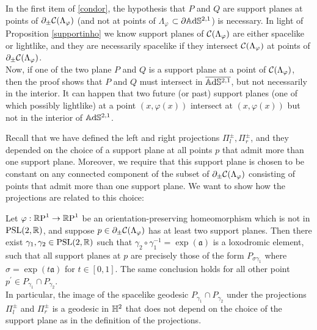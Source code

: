 \begin{observation}
In the first item of \ref{condor}, the hypothesis that $P$ and $Q$ are support planes at points of $\partial_\pm\CF$ (and not at points of $\Lambda_\varphi$ $\subset\partial\A^{2,1}$) is necessary. In light of Proposition \ref{supportinho} we know support planes of $\CF$ are either spacelike or lightlike, and they are necessarily spacelike if they intersect $\CF$ at points of $\partial_\pm\CF$. \\
Now, if one of the two plane $P$ and $Q$ is a support plane at a point of $\CF$, then the proof shows that $P$ and $Q$ must intersect in $\overline{\A^{2,1}}$, but not necessarily in the interior. It can happen that two future (or past) support planes (one of which possibly lightlike) at a point $(x,\varphi(x))$ intersect at $(x,\varphi(x))$ but not in the interior of $\A^{2,1}$.
\end{observation}
 
 Recall that we have defined the left and right projections $\Pi_l^\pm, \Pi_r^\pm$, and they depended on the choice of a support plane at all points $p$ that admit more than one support plane. Moreover, we require that this support plane is chosen to be constant on any connected component of the subset of $\partial_\pm\CF$ consisting of points that admit more than one support plane. We want to show how the projections are related to this choice:

\begin{corollary}\label{multipleplanes}
    Let $\varphi:\S\to\S$ be an orientation-preserving homeomorphism which is not in $\PSL$, and suppose $p\in \partial_\pm\CF$ has at least two support planes. Then there exist $\gamma_1,\gamma_2\in\PSL$ such that $\gamma_2\circ\gamma_1^{-1}=\exp(\mathfrak{a})$ is a loxodromic element, such that all support planes at $p$ are precisely those of the form $P_{\sigma\gamma_1}$ where $\sigma=\exp(t\mathfrak{a})$ for $t\in [0,1].$ The same conclusion holds for all other point $p^{\prime}\in P_{\gamma_1}\cap P_{\gamma_2}$. \\
    In particular, the image of the spacelike geodesic $P_{\gamma_1}\cap P_{\gamma_2}$ under the projections $\Pi_l^\pm$ and $\Pi_r^\pm$ is a geodesic in $\H^2$ that does not depend on the choice of the support plane as in the definition of the projections.  
\end{corollary}

